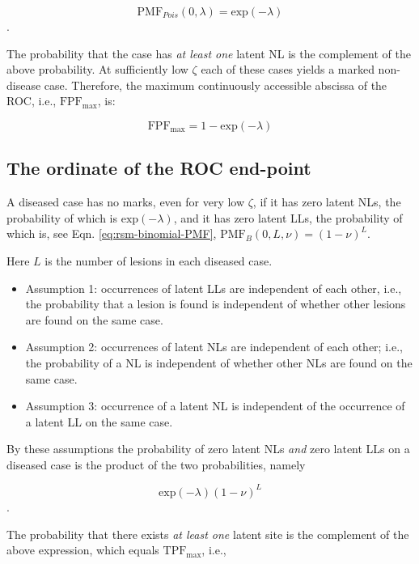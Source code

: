 \documentclass[
]{book}
\begin{document}
\[\text{PMF}_{Pois} \left (0,\lambda \right ) = \text{exp} \left ( -\lambda \right )\].

The probability that the case has \emph{at least one} latent NL is the complement of the above probability. At sufficiently low \(\zeta\) each of these cases yields a marked non-disease case. Therefore, the maximum continuously accessible abscissa of the ROC, i.e., \(\text{FPF}_{\text{max}}\), is:

\begin{equation} 
\text{FPF}_{\text{max}} = 1 - \text{exp} \left ( -\lambda \right )
\label{eq:rsm-predictions-fpf-max}
\end{equation}

\hypertarget{rsm-predictions-constrained-end-point-ordinate}{%
\subsection{The ordinate of the ROC end-point}\label{rsm-predictions-constrained-end-point-ordinate}}

A diseased case has no marks, even for very low \(\zeta\), if it has zero latent NLs, the probability of which is \(\text{exp}(-\lambda)\), and it has zero latent LLs, the probability of which is, see Eqn. \eqref{eq:rsm-binomial-PMF}, \(\text{PMF}_{B} \left ( 0, L, \nu \right )= (1 - \nu)^L\).

Here \(L\) is the number of lesions in each diseased case.

\begin{itemize}
\item
  Assumption 1: occurrences of latent LLs are independent of each other, i.e., the probability that a lesion is found is independent of whether other lesions are found on the same case.
\item
  Assumption 2: occurrences of latent NLs are independent of each other; i.e., the probability of a NL is independent of whether other NLs are found on the same case.
\item
  Assumption 3: occurrence of a latent NL is independent of the occurrence of a latent LL on the same case.
\end{itemize}

By these assumptions the probability of zero latent NLs \emph{and} zero latent LLs on a diseased case is the product of the two probabilities, namely

\[\text{exp}(-\lambda) (1 - \nu)^L\].

The probability that there exists \emph{at least one} latent site is the complement of the above expression, which equals \(\text{TPF}_{\text{max}}\), i.e.,
\end{document}
